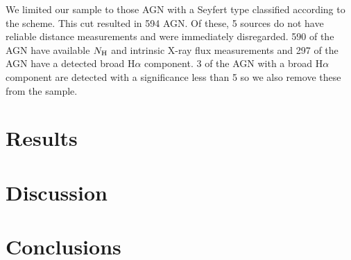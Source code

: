 \documentclass[twocolumn,trackchanges]{aastex61}
\newcommand{\halpha}{H$\alpha$}
\newcommand{\nh}{$N_{\rm H}$}
\begin{document}
We limited our sample to those AGN with a Seyfert type classified according to the \citep{Winkler:1992kx} scheme. This cut resulted in 594 AGN. Of these, 5 sources do not have reliable distance measurements and were immediately disregarded. 590 of the AGN have available \nh{} and intrinsic X-ray flux measurements and 297 of the AGN have a detected broad \halpha{} component. 3 of the AGN with a broad \halpha{} component are detected with a significance less than 5 so we also remove these from the sample.
 
 
\section{Results}\label{sec:results}
\section{Discussion}\label{sec:discuss}
\section{Conclusions}\label{sec:conclude}

\acknowledgments
	


\end{document}
